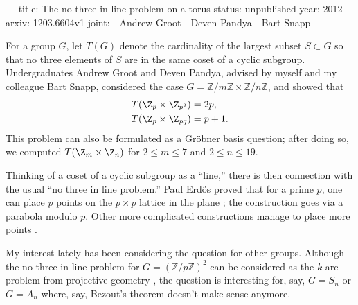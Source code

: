 ---
title: The no-three-in-line problem on a torus
status: unpublished
year: 2012
arxiv: 1203.6604v1
joint:
  - Andrew Groot
  - Deven Pandya
  - Bart Snapp
---

For a group $G$, let $T(G)$ denote the cardinality of the largest subset $S \subset G$ so that no three elements of $S$ are in the same coset of a cyclic subgroup.  Undergraduates Andrew Groot and Deven Pandya, advised by myself and my colleague Bart Snapp, considered the case $G = \mathbb{Z}/m\mathbb{Z} \times \mathbb{Z}/n\mathbb{Z}$, and showed that 
  \begin{align*}
    T(\Z_p \times \Z_{p^2}) &= 2p, \\
    T(\Z_p \times \Z_{pq})  &= p+1.
  \end{align*}
  This problem can also be formulated as a Gr\"obner basis question; after doing so, we computed $T(\Z_m \times \Z_n)$ for $2 \leq m \leq 7$ and $2 \leq n \leq 19$.

Thinking of a coset of a cyclic subgroup as a ``line,'' there is then connection with the usual ``no three in line problem.''  Paul Erd\H{o}s proved that for a prime $p$, one can place $p$ points on the $p\times p$ lattice in the plane \cite{MR41889}; the construction goes via a parabola modulo $p$.  Other more complicated constructions manage to place more points \cite{MR366817}.

My interest lately has been considering the question for other groups.  Although the no-three-in-line problem for $G = (\mathbb{Z}/p\mathbb{Z})^2$ can be considered as the $k$-arc problem from projective geometry \cite{MR554919}, the question is interesting for, say, $G = S_n$ or $G = A_n$ where, say, Bezout's theorem doesn't make sense anymore.

